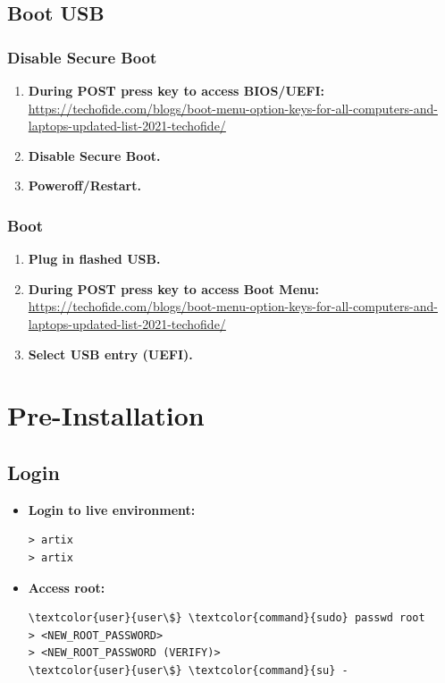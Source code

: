 \documentclass[10pt, a4paper, onecolumn, oneside, titlepage, openany]{book}
\begin{document}
\section{Boot USB}
\subsection{Disable Secure Boot}
\begin{enumerate}
    \item \textbf{During POST press key to access BIOS/UEFI:}
\newline \href{https://techofide.com/blogs/boot-menu-option-keys-for-all-computers-and-laptops-updated-list-2021-techofide/}{https://techofide.com/blogs/boot-menu-option-keys-for-all-computers-and-laptops-updated-list-2021-techofide/}
    \item \textbf{Disable Secure Boot.}
    \item \textbf{Poweroff/Restart.}
\end{enumerate}
\subsection{Boot}
\begin{enumerate}
    \item \textbf{Plug in flashed USB.}
    \item \textbf{During POST press key to access Boot Menu:}
\newline \href{https://techofide.com/blogs/boot-menu-option-keys-for-all-computers-and-laptops-updated-list-2021-techofide/}{https://techofide.com/blogs/boot-menu-option-keys-for-all-computers-and-laptops-updated-list-2021-techofide/}
    \item \textbf{Select USB entry (UEFI).}
\end{enumerate}


\chapter{Pre-Installation}
\section{Login}
\begin{itemize}
    \item \textbf{Login to live environment:}
\begin{Verbatim}[commandchars=\\\{\}]
> artix
> artix
\end{Verbatim}
    \item \textbf{Access root:}
\begin{Verbatim}[commandchars=\\\{\}]
\textcolor{user}{user\$} \textcolor{command}{sudo} passwd root
> <NEW_ROOT_PASSWORD>
> <NEW_ROOT_PASSWORD (VERIFY)>
\textcolor{user}{user\$} \textcolor{command}{su} -
\end{Verbatim}
\end{itemize}
\end{document}
